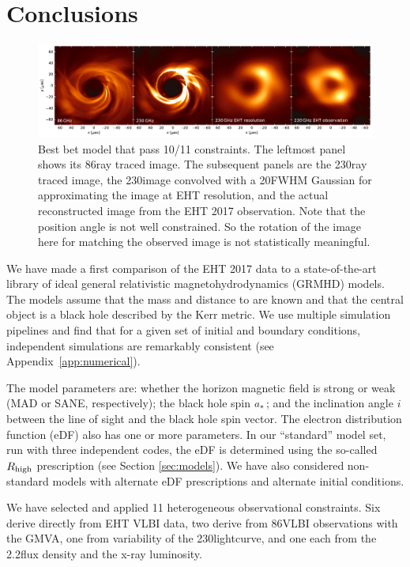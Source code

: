 \section{Conclusions}
\label{sec:conclusions}

\begin{figure}
  \centering
  \includegraphics[width=\textwidth]{figures/bestbet_imgs.pdf}
  \caption{Best bet model that pass 10/11 constraints.
    The leftmost panel shows its 86\GHz ray traced image.
    The subsequent panels are the 230\GHz ray traced image,
    the 230\GHz image convolved with a 20\uas FWHM Gaussian for approximating the image at EHT resolution, and
    the actual reconstructed image from the EHT 2017 observation.
    Note that the position angle is not well constrained.
    So the rotation of the image here for matching the observed image is not statistically meaningful.}
  \label{fig:bestbet_imgs}
\end{figure}

We have made a first comparison of the EHT 2017 \sgra data to a state-of-the-art library of ideal general relativistic magnetohydrodynamics (GRMHD) models.  The models assume that the mass and distance to \sgra are known and that the central object is a black hole described by the Kerr metric.  We use multiple simulation pipelines and find that for a given set of initial and boundary conditions, independent simulations are remarkably consistent (see Appendix~\ref{app:numerical}).

The model parameters are: whether the horizon magnetic field is strong or weak (MAD or SANE, respectively); the black hole spin $a_*$; and the inclination angle $i$ between the line of sight and the black hole spin vector.  The electron distribution function (eDF) also has one or more parameters.  In our ``standard'' model set, run with three independent codes, the eDF is determined using the so-called $R_\mathrm{high}$ prescription (see Section \ref{sec:models}).  We have also considered non-standard models with alternate eDF prescriptions and alternate initial conditions.

We have selected and applied 11 heterogeneous observational constraints.  Six derive directly from EHT VLBI data, two derive from 86\GHz VLBI observations with the GMVA, one from variability of the 230\GHz lightcurve, and one each from the 2.2\um flux density and the x-ray luminosity.

